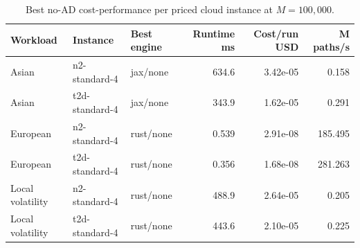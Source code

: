 \begin{table}[htbp]
\centering
\small
\caption{Best no-AD cost-performance per priced cloud instance at $M=100{,}000$.}
\label{tab:cloud-cost-performance}
\begin{tabularx}{\textwidth}{llYrrr}
\toprule
\textbf{Workload} & \textbf{Instance} & \textbf{Best engine} & \textbf{Runtime ms} & \textbf{Cost/run USD} & \textbf{M paths/s} \\
\midrule
Asian & n2-standard-4 & jax/none & 634.6 & 3.42e-05 & 0.158 \\
Asian & t2d-standard-4 & jax/none & 343.9 & 1.62e-05 & 0.291 \\
European & n2-standard-4 & rust/none & 0.539 & 2.91e-08 & 185.495 \\
European & t2d-standard-4 & rust/none & 0.356 & 1.68e-08 & 281.263 \\
Local volatility & n2-standard-4 & rust/none & 488.9 & 2.64e-05 & 0.205 \\
Local volatility & t2d-standard-4 & rust/none & 443.6 & 2.10e-05 & 0.225 \\
\bottomrule
\end{tabularx}
\end{table}

